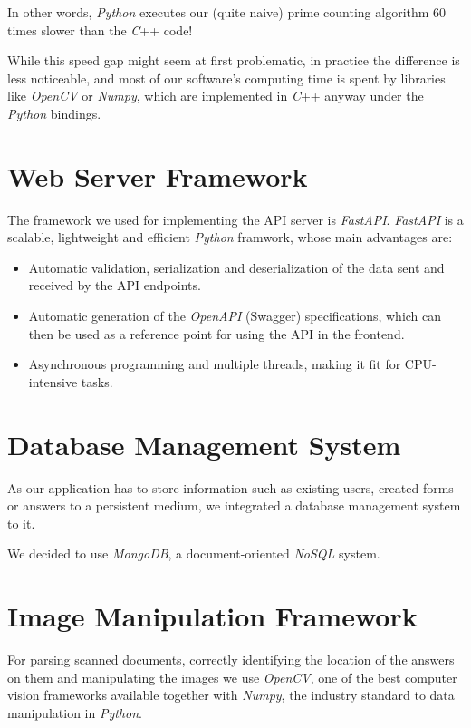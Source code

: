 \documentclass[12pt, a4paper]{report}
\begin{document}
In other words, \textit{Python} executes our (quite naive) prime counting algorithm $60$ times slower than the \textit{C}++ code!

While this speed gap might seem at first problematic, in practice the difference is less noticeable, and most of our software's computing time is spent by libraries like \textit{OpenCV} or \textit{Numpy}, which are implemented in \textit{C}++ anyway under the \textit{Python} bindings.

\section{Web Server Framework}

The framework we used for implementing the API server is \textit{FastAPI}. \textit{FastAPI} is a scalable, lightweight and efficient \textit{Python} framwork, whose main advantages are:
\begin{itemize}
    \item Automatic validation, serialization and deserialization of the data sent and received by the API endpoints.
    \item Automatic generation of the \textit{OpenAPI} (Swagger) specifications, which can then be used as a reference point for using the API in the frontend.
    \item Asynchronous programming and multiple threads, making it fit for CPU-intensive tasks.
\end{itemize}

\section{Database Management System}

As our application has to store information such as existing users, created forms or answers to a persistent medium, we integrated a database management system to it.

We decided to use \textit{MongoDB}, a document-oriented \textit{NoSQL} system.

\section{Image Manipulation Framework}

For parsing scanned documents, correctly identifying the location of the answers on them and manipulating the images we use \textit{OpenCV}, one of the best computer vision frameworks available together with \textit{Numpy}, the industry standard to data manipulation in \textit{Python}.
\end{document}
